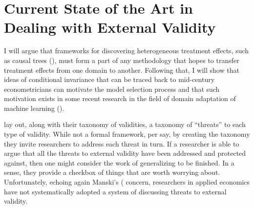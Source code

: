 \documentclass[a4paper,12pt]{article}
\begin{document}
 





\section{ Current State of the Art in Dealing with External Validity }



I will argue that frameworks for discovering heterogeneous treatment effects, such as causal trees (\cite{Athey2016}), must form a part of any methodology that hopes to transfer treatment effects from one domain to another. Following that, I will show that ideas of conditional invariance that can be traced back to mid-century econometricians can motivate the model selection process and that such motivation exists in some recent research in the field of domain adaptation of machine learning (\cite{Rojas-carulla2018}).


\cite{Shadish2002} lay out, along with their taxonomy of validities, a taxonomy of ``threats'' to each type of validity. While not a formal framework, per say, by creating the taxonomy they invite researchers to address each threat in turn. If a researcher is able to argue that all the threats to external validity have been addressed and protected against, then one might consider the work of generalizing to be finished. In a sense, they provide a checkbox of things that are worth worrying about. Unfortunately, echoing again Manski's (\parencite*{Manski2008} concern, researchers in applied economics have not systematically adopted a system of discussing threats to external validity.
\end{document}
